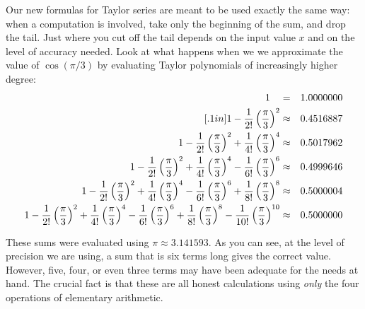 {{{{     Our new formulas for Taylor series are meant to be used exactly the same way: 
when a computation is involved, take only the beginning of the sum, and drop the tail.  Just where you cut off the tail depends on the input value $x$ and on the level of accuracy needed.  Look at what happens when we we approximate the value of $\cos(\pi/3)$ by evaluating Taylor polynomials of increasingly higher degree:
\small 
        \begin{eqnarray*}
        1 \quad &=& 1.0000000 \\ [.1in]
        1 - {1 \over 2!} \left( {\pi \over 3} \right)^2 
                &\approx & 0.4516887 \\
        1 - {1 \over 2!} \left( {\pi \over 3} \right)^2 
                + {1 \over 4!} \left( {\pi \over 3} \right)^4
                &\approx & 0.5017962 \\
        1 - {1 \over 2!} \left( {\pi \over 3} \right)^2 
                + {1 \over 4!} \left( {\pi \over 3} \right)^4
                - {1 \over 6!} \left( {\pi \over 3} \right)^6
                &\approx & 0.4999646 \\
        1 - {1 \over 2!} \left( {\pi \over 3} \right)^2 
                + {1 \over 4!} \left( {\pi \over 3} \right)^4
                - {1 \over 6!} \left( {\pi \over 3} \right)^6
                + {1 \over 8!} \left( {\pi \over 3} \right)^8
                &\approx & 0.5000004 \\
        1 - {1 \over 2!} \left( {\pi \over 3} \right)^2 
                + {1 \over 4!} \left( {\pi \over 3} \right)^4
                - {1 \over 6!} \left( {\pi \over 3} \right)^6
                + {1 \over 8!} \left( {\pi \over 3} \right)^8
                - {1 \over 10!} \left( {\pi \over 3} \right)^{10}
                &\approx & 0.5000000 
        \end{eqnarray*}
\normalsize


These sums were evaluated using $\pi \approx 3.141593$.  As you can see, at the level of precision we are using, a sum that is six terms long gives the correct value.  However, five, four, or even three terms may have been adequate for the needs at hand.  The crucial fact is that these are all honest calculations using {\em only\/} the four operations of elementary arithmetic. 

}}}}
